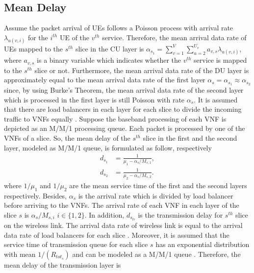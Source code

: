 \documentclass[conference]{IEEEtran}
\begin{document}
\begin{enumerate}
\subsection{Mean Delay}
Assume the packet arrival of UEs follows a Poisson process with arrival rate $\lambda_{u(v,i)}$ for the $i^{th}$ UE of the $v^{th}$ service.
Therefore, the mean arrival data rate of UEs mapped to the $s^{th}$ slice in the CU layer is $\alpha_{s_1} = \sum_{v=1}^{V}\sum_{u=2}^{U_v}a_{v,s}\lambda_{u(v,i)}$, where $a_{v,s}$ is a binary variable which indicates whether the $v^{th}$ service is mapped to the $s^{th}$ slice or not.
Furthermore, the mean arrival data rate of the DU layer is approximately equal to the mean arrival data rate of the first layer $\alpha_{s} =\alpha_{s_1} \approx \alpha_{s_2}$ since, by using Burke’s Theorem, the mean arrival data rate of the second layer which is processed in the first layer is still Poisson with rate $\alpha_{s}$.
It is assumed that there are load balancers in each layer for each slice to divide the incoming traffic to VNFs equally \cite{frdl,luong2018novel,luong2018novel1}.
Suppose the baseband processing of each VNF is depicted as an M/M/1 processing queue.
Each packet is processed by one of the VNFs of a slice. So, the mean delay of the $s^{th}$ slice in the first and the second layer, modeled as M/M/1 queue, is formulated as follow, respectively
\begin{equation}
\begin{split}
d_{s_1} &= \frac{1}{\mu_1 - \alpha_{s}/{M_{s,1}}},\\
d_{s_2} &= \frac{1}{\mu_2 - \alpha_{s}/{M_{s,2}}}.
\end{split}
\end{equation}
where $1/\mu_1$ and $1/\mu_2$ are the mean service time of the first and the second layers respectively.
Besides, $\alpha_{s}$ is the  arrival rate which is divided
by load balancer before arriving to the VNFs. The  arrival rate of each VNF in each layer of the slice $s$ is $\alpha_{s}/{M_{s,i}}$ $ i \in \{1,2\}$.
In addition, $d_{s_{tr}}$ is the transmission delay for $s^{th}$ slice on the  wireless link. The arrival data rate of wireless link
 is equal to the arrival data rate of load balancers for each slice \cite{frdl}.
Moreover, it is assumed that the service time of transmission queue for each slice $s$ has
 an exponential distribution with mean $1/(R_{{tot}_s})$ and can be modeled as a M/M/1 queue \cite{frdl,luong2018novel,luong2018novel1,guo2016exploiting}. Therefore,
the mean delay of the transmission layer is
\begin{equation}

\end{equation}
\end{enumerate}
\end{document}
